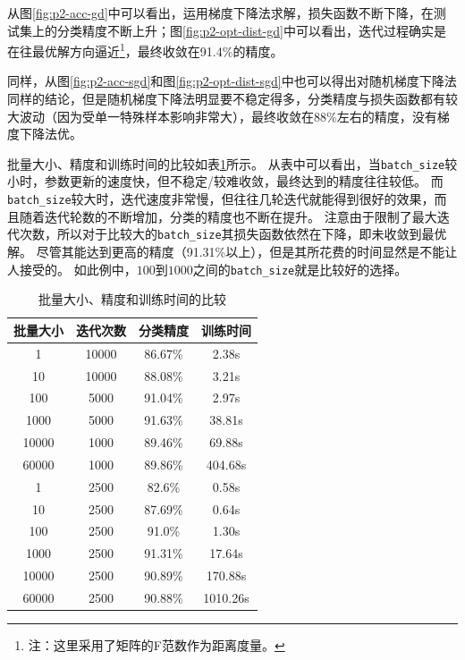 \documentclass[logo,reportComp]{thesis}
\begin{document}
从图\ref{fig:p2-acc-gd}中可以看出，运用梯度下降法求解，损失函数不断下降，在测试集上的分类精度不断上升；图\ref{fig:p2-opt-dist-gd}中可以看出，迭代过程确实是在往最优解方向逼近\footnote{注：这里采用了矩阵的F范数作为距离度量。}，最终收敛在91.4\%的精度。

同样，从图\ref{fig:p2-acc-sgd}和图\ref{fig:p2-opt-dist-sgd}中也可以得出对随机梯度下降法同样的结论，但是随机梯度下降法明显要不稳定得多，分类精度与损失函数都有较大波动（因为受单一特殊样本影响非常大），最终收敛在88\%左右的精度，没有梯度下降法优。

批量大小、精度和训练时间的比较如表\ref{tab:minibatch}所示。
从表中可以看出，当\verb'batch_size'较小时，参数更新的速度快，但不稳定/较难收敛，最终达到的精度往往较低。
而\verb'batch_size'较大时，迭代速度非常慢，但往往几轮迭代就能得到很好的效果，而且随着迭代轮数的不断增加，分类的精度也不断在提升。
注意由于限制了最大迭代次数，所以对于比较大的\verb'batch_size'其损失函数依然在下降，即未收敛到最优解。
尽管其能达到更高的精度（91.31\%以上），但是其所花费的时间显然是不能让人接受的。
如此例中，$100$到$1000$之间的\verb'batch_size'就是比较好的选择。
\begin{table}[H]
\caption{批量大小、精度和训练时间的比较}
\label{tab:minibatch}
\centering
\begin{tabular}{|c|c|c|c|}\hline
\textbf{批量大小} & \textbf{迭代次数} & \textbf{分类精度} & \textbf{训练时间}\\\hline
1 & 10000 & 86.67\% & 2.38s\\\hline
10 & 10000 & 88.08\% & 3.21s\\\hline
100 & 5000 & 91.04\% & 2.97s\\\hline
1000 & 5000 & 91.63\% & 38.81s\\\hline
10000 & 1000 & 89.46\% & 69.88s\\\hline
60000 & 1000 & 89.86\% & 404.68s\\\hline
1 & 2500 & 82.6\% & 0.58s\\\hline
10 & 2500 & 87.69\% & 0.64s\\\hline
100 & 2500 & 91.0\% & 1.30s\\\hline
1000 & 2500 & 91.31\% & 17.64s\\\hline
10000 & 2500 & 90.89\% & 170.88s\\\hline
60000 & 2500 & 90.88\% & 1010.26s\\\hline
\end{tabular}
\end{table}
\end{document}

